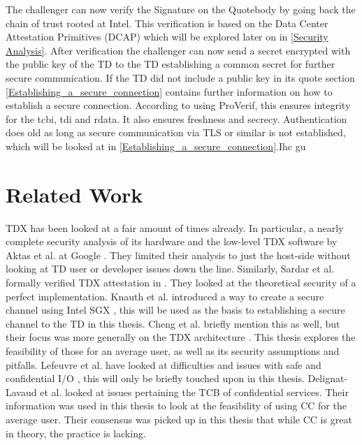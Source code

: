 The challenger can now verify the Signature on the Quotebody by going back the chain of trust rooted at Intel. This verification is based on the Data Center Attestation Primitives (DCAP) which will be explored later on in \ref{Security Analysis}. After verification the challenger can now send a secret encrypted with the public key of the TD to the TD establishing a common secret for further secure communication. If the TD did not include a public key in its quote section \cref{Establishing_a_secure_connection} contains further information on how to establish a secure connection. According to \cite{sardar_formal_2023} using ProVerif, this ensures integrity for the tcbi, tdi and rdata. It also ensures freshness and secrecy. Authentication does old as long as secure communication via TLS or similar is not established, which will be looked at in \cref{Establishing_a_secure_connection}.Ihc gu

\section{Related Work}
TDX has been looked at a fair amount of times already. In particular, a nearly complete security analysis of its hardware and the low-level TDX software by Aktas et al. at Google \cite{aktas_intel_nodate}. They limited their analysis to just the host-side without looking at TD user or developer issues down the line. Similarly, Sardar et al. formally verified TDX attestation in \cite{sardar_demystifying_2021}. They looked at the theoretical security of a perfect implementation. Knauth et al. introduced a way to create a secure channel using Intel SGX \cite{knauth_integrating_2019}, this will be used as the basis to establishing a secure channel to the TD in this thesis. Cheng et al. briefly mention this as well, but their focus was more generally on the TDX architecture \cite{cheng_intel_2023}. This thesis explores the feasibility of those for an average user, as well as its security assumptions and pitfalls. Lefeuvre et al. have looked at difficulties and issues with safe and confidential I/O \cite{lefeuvre_towards_2023}, this will only be briefly touched upon in this thesis. Delignat-Lavaud et al. looked at issues pertaining the TCB of confidential services. Their information was used in this thesis to look at the feasibility of using CC for the average user. Their consensus was picked up in this thesis that while CC is great in theory, the practice is lacking.


